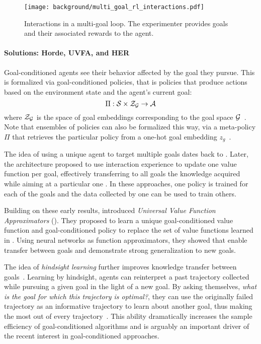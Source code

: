 \begin{figure}[!h]
\centering
\texttt{[image: background/multi\_goal\_rl\_interactions.pdf]}	
\caption{Interactions in a multi-goal \rl loop. The experimenter provides goals and their associated rewards to the agent.}
\label{fig:mg_rl_interactions}
\end{figure}


\paragraph{Solutions: Horde, UVFA, and HER}

Goal-conditioned agents see their behavior affected by the goal they pursue. This is formalized via goal-conditioned policies, that is policies that produce actions based on the environment state and the agent's current goal: 
\begin{equation}
\Pi:\mathcal{S}\times\mathcal{Z}_{\mathcal{G}}\to\mathcal{A}
\end{equation}
where $\mathcal{Z}_{\mathcal{G}}$ is the space of goal embeddings corresponding to the goal space $\mathcal{G}$~\citep{schaul2015universal}. Note that ensembles of policies can also be formalized this way, via a meta-policy $\Pi$ that retrieves the particular policy from a one-hot goal embedding $z_g$~\citep{kaelbling1993learning,sutton2011horde}.

The idea of using a unique \rl agent to target multiple goals dates back to \citep{kaelbling1993learning}. Later, the \horde architecture proposed to use interaction experience to update one value function per goal, effectively transferring to all goals the knowledge acquired while aiming at a particular one \cite{sutton2011horde}. In these approaches, one policy is trained for each of the goals and the data collected by one can be used to train others.

Building on these early results, \citet{schaul2015universal} introduced \textit{Universal Value Function Approximators} (\uvfa). They proposed to learn a unique goal-conditioned value function and goal-conditioned policy to replace the set of value functions learned in \horde. Using neural networks as function approximators, they showed that \uvfas enable transfer between goals and demonstrate strong generalization to new goals.

The idea of \textit{hindsight learning} further improves knowledge transfer between goals~\citep{kaelbling1993learning,andrychowicz2017hindsight}. Learning by hindsight, agents can reinterpret a past trajectory collected while pursuing a given goal in the light of a new goal. By asking themselves, \textit{what is the goal for which this trajectory is optimal?}, they can use the originally failed trajectory as an informative trajectory to learn about another goal, thus making the most out of every trajectory~\citep{eysenbach2020rewriting}. This ability dramatically increases the sample efficiency of goal-conditioned algorithms and is arguably an important driver of the recent interest in goal-conditioned \rl approaches.


